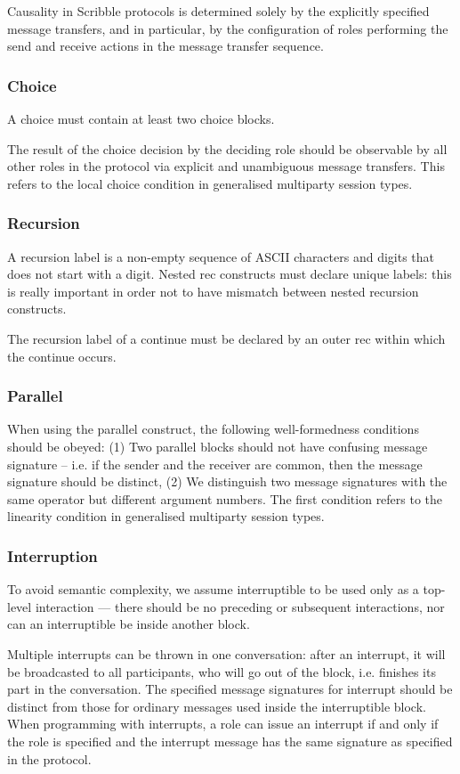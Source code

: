 \documentclass[a4paper,11pt,twoside]{report}
\begin{document}
Causality in Scribble protocols is determined solely by the explicitly specified message transfers, and in particular, by the configuration of roles performing the send and receive actions in the message transfer sequence.

\subsubsection{Choice}
A choice must contain at least two choice blocks. 

The result of the choice decision by the deciding role should be observable by all other roles in the protocol via explicit and unambiguous message transfers. This refers to the local choice condition in generalised multiparty session types.

\subsubsection{Recursion}
A recursion label is a non-empty sequence of ASCII characters and digits that does not start with a digit. Nested rec constructs must declare unique labels: this is really important in order not to have mismatch between nested recursion constructs. 

The recursion label of a continue must be declared by an outer rec within which the continue occurs.

\subsubsection{Parallel}
When using the parallel construct, the following well-formedness conditions should be obeyed: (1) Two parallel blocks should not have confusing message signature -- i.e. if the sender and the receiver are common, then the message signature should be distinct, (2) We distinguish two message signatures with the same operator but different argument numbers. The first condition refers to the linearity condition in generalised multiparty session types.

\subsubsection{Interruption}
To avoid semantic complexity, we assume interruptible to be used only as a top-level interaction --- there should be no preceding or subsequent interactions, nor can an interruptible be inside another block. 

Multiple interrupts can be thrown in one conversation: after an interrupt, it will be broadcasted to all participants, who will go out of the block, i.e. finishes its part in the conversation. The specified message signatures for interrupt should be distinct from those for ordinary messages used inside the interruptible block. When programming with interrupts, a role can issue an interrupt if and only if the role is specified and the interrupt message has the same signature as specified in the protocol. 
\end{document}
